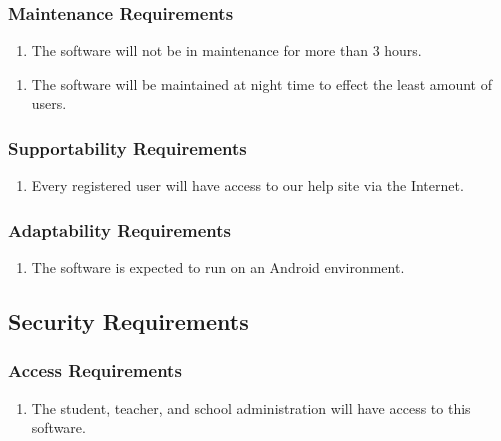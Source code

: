 \documentclass[]{article}
\begin{document}
\subsubsection{Maintenance Requirements}
\label{ssub:maintenance_requirements}
\begin{enumerate}[{MS}1. ]
	\item The software will not be in maintenance for more than 3 hours.
\end{enumerate}
\begin{enumerate}[{MS}2. ]
	\item The software will be maintained at night time to effect the least amount of users.
\end{enumerate}

\subsubsection{Supportability Requirements}
\label{ssub:supportability_requirements}
\begin{enumerate}[{MS}1. ]
	\item Every registered user will have access to our help site via the Internet.
\end{enumerate}

\subsubsection{Adaptability Requirements}
\label{ssub:adaptability_requirements}
\begin{enumerate}[{MS}1. ]
	\item  The software is expected to run on an Android environment.
\end{enumerate}


\subsection{Security Requirements}
\label{sub:security_requirements}

\subsubsection{Access Requirements}
\label{ssub:access_requirements}
\begin{enumerate}[{SR}1. ]
	\item The student, teacher, and school administration will have access to this software.
\end{enumerate}
\end{document}
